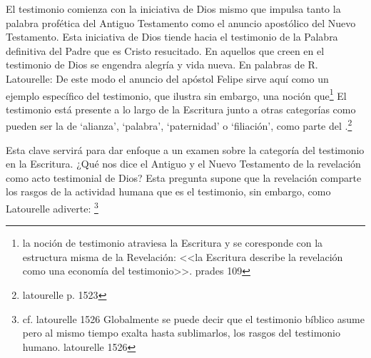 El testimonio comienza con la iniciativa de Dios mismo que impulsa tanto la
palabra profética del Antiguo Testamento como el anuncio apostólico del Nuevo
Testamento. Esta iniciativa de Dios tiende hacia el testimonio de la Palabra
definitiva del Padre que es Cristo resucitado. En aquellos que creen en el
testimonio de Dios se engendra alegría y vida nueva. En palabras de R.
Latourelle:
De este modo el anuncio del apóstol Felipe sirve aquí como un ejemplo específico
del testimonio, que ilustra sin embargo, una noción
que\footnote{la noción de testimonio atraviesa
  la Escritura y se coresponde con la estructura misma de la Revelación: <<la
  Escritura describe la revelación como una economía del testimonio>>. prades
  109} El testimonio está presente a lo largo de la Escritura junto a otras
categorías como pueden ser la de `alianza', `palabra', `paternidad' o
`filiación', como parte del .\footnote{latourelle p. 1523}

Esta clave servirá para dar enfoque a un examen sobre la categoría del
testimonio en la Escritura. ¿Qué nos dice el Antiguo y el Nuevo Testamento de la
revelación como acto testimonial de Dios? Esta pregunta supone que la revelación
comparte los rasgos de la actividad humana que es el testimonio, sin embargo,
como Latourelle adiverte: \footnote{cf. latourelle 1526 Globalmente se
  puede decir que el testimonio bíblico asume pero al mismo tiempo exalta hasta
  sublimarlos, los rasgos del testimonio humano. latourelle 1526}

